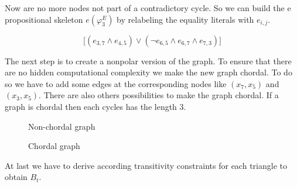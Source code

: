 \documentclass[11pt,a4paper]{uebung}
\begin{document}
Now are no more nodes not part of a contradictory cycle. So we can build the e propositional skeleton $ e(\varphi^E_3) $ by
  relabeling the equality literals with $e_{i,j}$.


\begin{displaymath}
   \big[ ( e_{3,7} \land e_{4,5} )
  \lor ( \neg e_{6,5} \land e_{6,7} \land e_{7,3})\big]
 \end{displaymath}

The next step is to create a nonpolar version of the graph. To ensure that there are no hidden computational complexity we make the new graph chordal. To do so we have to add some edges at the corresponding nodes like $(x_7,x_5)$ and $(x_3,x_5)$. There are also others possibilities to make the graph chordal. If a graph is chordal then each cycles has the length 3. 

\begin{figure}[h]
    \centering
    \caption{Non-chordal graph}
    \label{fig:sp3}
  \end{figure}


\begin{figure}[h]
    \centering
    \caption{Chordal graph}
    \label{fig:sp4}
  \end{figure}

At last we have to derive according transitivity constraints for each triangle to obtain $B_t$.
  
\end{document}
